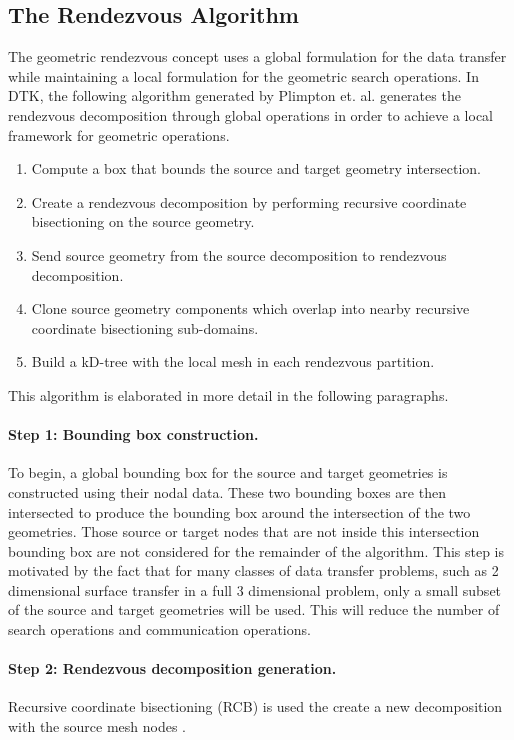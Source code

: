 \documentclass[letterpaper,12pt]{article}
\begin{document}
\subsection{The Rendezvous Algorithm}\label{subsec:rendezvous_alg}
The geometric rendezvous concept uses a global formulation for the
data transfer while maintaining a local formulation for the geometric
search operations. In DTK, the following algorithm generated by
Plimpton et. al. \cite{Plimpton_2004} generates the rendezvous
decomposition through global operations in order to achieve a local
framework for geometric operations. 

\begin{enumerate}
\item Compute a box that bounds the source and target geometry
  intersection.
\item Create a rendezvous decomposition by performing recursive
  coordinate bisectioning on the source geometry.
\item Send source geometry from the source decomposition to rendezvous
  decomposition.
\item Clone source geometry components which overlap into nearby
  recursive coordinate bisectioning sub-domains.
\item Build a kD-tree with the local mesh in each rendezvous
  partition.
\end{enumerate}

This algorithm is elaborated in more detail in the following
paragraphs.

\paragraph{Step 1: Bounding box construction.}
To begin, a global bounding box for the source and target geometries
is constructed using their nodal data. These two bounding boxes are
then intersected to produce the bounding box around the intersection
of the two geometries. Those source or target nodes that are not
inside this intersection bounding box are not considered for the
remainder of the algorithm. This step is motivated by the fact that
for many classes of data transfer problems, such as 2 dimensional
surface transfer in a full 3 dimensional problem, only a small subset
of the source and target geometries will be used. This will reduce the
number of search operations and communication operations.

\paragraph{Step 2: Rendezvous decomposition generation.}
Recursive coordinate bisectioning (RCB) is used the create a new
decomposition with the source mesh nodes \cite{Berger_1987}.
\end{document}
